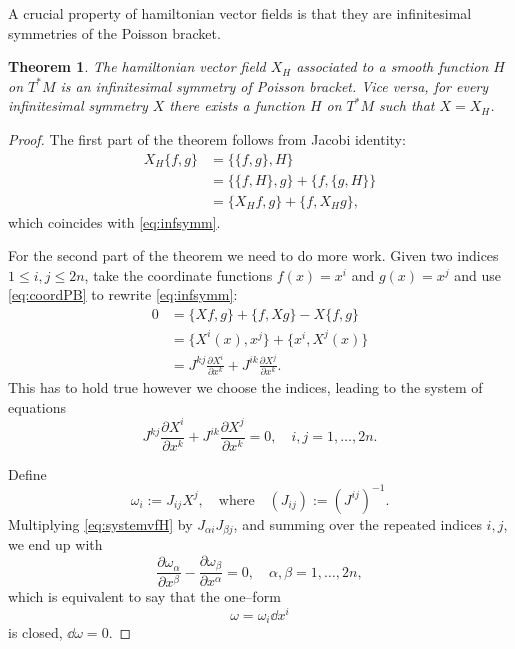 \documentclass[english,fontsize=11pt,paper=b5]{scrbook}
\numberwithin{equation}{chapter}
\newtheorem{theorem}{Theorem}[chapter]
\theoremstyle{definition}
\begin{document}
    A crucial property of hamiltonian vector fields is that they are infinitesimal symmetries of the Poisson bracket.

    \begin{theorem}\label{thm:vf-infsym}
      The hamiltonian vector field $X_H$ associated to a smooth function $H$ on $T^*M$ is an infinitesimal symmetry of Poisson bracket.
      Vice versa, for every infinitesimal symmetry $X$ there exists a function $H$ on $T^*M$ such that $X = X_H$.
    \end{theorem}
    \begin{proof}
      The first part of the theorem follows from Jacobi identity:
      \begin{align}
        X_H \big\{f,g\big\} & = \big\{\big\{f,g\big\}, H\big\}                                \\
                            & = \big\{\big\{f,H\big\},g\big\} + \big\{f,\big\{g,H\big\}\big\} \\
                            & = \big\{X_Hf,g\big\} + \big\{f,X_Hg\big\},
      \end{align}
      which coincides with \eqref{eq:infsymm}.

      For the second part of the theorem we need to do more work.
      Given two indices $1\leq i,j \leq 2n$, take the coordinate functions $f(x) = x^i$ and $g(x) = x^j$ and use \eqref{eq:coordPB} to rewrite \eqref{eq:infsymm}:
      \begin{align}
        0 & = \big\{X f,g\big\} + \big\{f, Xg\big\} - X \big\{f,g\big\}                            \\
          & = \big\{X^i(x),x^j\big\} + \big\{x^i,X^j(x)\big\}                                      \\
          & = J^{kj} \frac{\partial X^i}{\partial x^k} + J^{ik} \frac{\partial X^j}{\partial x^k}.
      \end{align}
      This has to hold true however we choose the indices, leading to the system of equations
      \begin{equation}\label{eq:systemvfH}
        J^{kj} \frac{\partial X^i}{\partial x^k} + J^{ik} \frac{\partial X^j}{\partial x^k} = 0, \quad i,j = 1,\ldots,2n.
      \end{equation}

      Define
      \begin{equation}
        \omega_i := J_{ij} X^j, \quad\mbox{where}\quad (J_{ij}) := (J^{ij})^{-1}.
      \end{equation}
      Multiplying \eqref{eq:systemvfH} by $J_{\alpha i} J_{\beta j}$, and summing over the repeated indices $i,j$, we end up with
      \begin{equation}
        \frac{\partial \omega_\alpha}{\partial x^\beta} - \frac{\partial \omega_\beta}{\partial x^\alpha} = 0, \quad \alpha,\beta = 1, \ldots, 2n,
      \end{equation}
      which is equivalent to say that the one--form
      \begin{equation}
        \omega = \omega_i \dd x^i
      \end{equation}
      is closed, $\dd \omega = 0$.


\end{proof}
\end{document}
